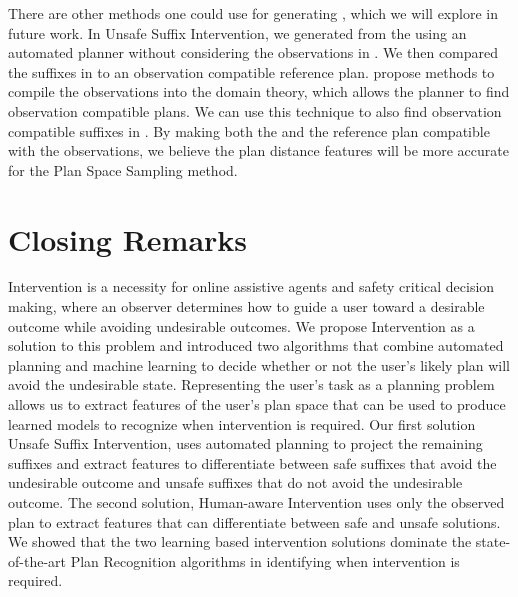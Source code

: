 There are other methods one could use for generating \Suffixes, which we will explore in future work.
In Unsafe Suffix Intervention, we generated \Suffixes from the \historyEndState using an automated planner without considering the observations in \historyDef.
We then compared the suffixes in \Suffixes to an observation compatible reference plan.
\cite{ramirez2009plan, ramirez2010probabilistic, sohrabi2016plan} propose methods to compile the observations into the domain theory, which allows the planner to find observation compatible plans.
We can use this technique to also find observation compatible suffixes in \Suffixes.
By making both the \Suffixes and the reference plan compatible with the observations, we believe the plan distance features will be more accurate for the Plan Space Sampling method.


\section{Closing Remarks}
\label{sec:closing}
Intervention is a necessity for online assistive agents and safety critical decision making, where an observer determines how to guide a user toward a desirable outcome while avoiding undesirable outcomes. 
We propose Intervention as a solution to this problem and introduced two algorithms that combine automated planning and machine learning to decide whether or not the user's likely plan will avoid the undesirable state. 
Representing the user's task as a planning problem allows us to extract features of the user's plan space that can be used to produce learned models to recognize when intervention is required. 
Our first solution Unsafe Suffix Intervention, uses automated planning to project the remaining suffixes and extract features to differentiate between safe suffixes that avoid the undesirable outcome and unsafe suffixes that do not avoid the undesirable outcome. 
The second solution, Human-aware Intervention uses only the observed plan to extract features that can differentiate between safe and unsafe solutions. 
We showed that the two learning based intervention solutions dominate the state-of-the-art Plan Recognition algorithms in identifying when intervention is required.

